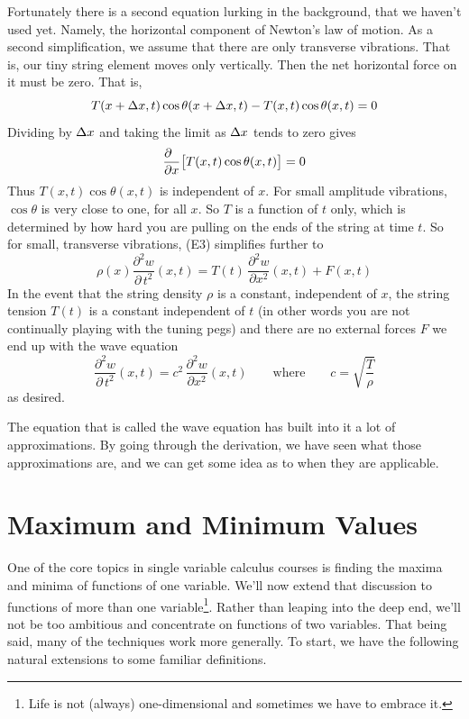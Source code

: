 Fortunately there is a second
equation lurking in the background, that we haven't used yet. Namely, the 
horizontal component of Newton's law of motion. As a second simplification,
we assume that there are only transverse vibrations. That is, our tiny 
string element moves only vertically. Then the net horizontal force on 
it must be zero. That is,
\begin{equation*}
T(x+\Delta x,t)\cos\theta(x+\Delta x,t)-T(x,t)\cos\theta(x,t)=0
\end{equation*}
Dividing by $\Delta x$ and taking the limit as $\Delta x$ tends to zero gives
\begin{equation*}
\frac{\partial \hfill}{\partial x}\big[T(x,t)\cos\theta(x,t)\big]=0
\end{equation*}
Thus $T(x,t)\cos\theta(x,t)$ is independent of $x$.
For small amplitude vibrations, $\cos\theta$ is very close to one, for all
$x$. So $T$ is a function of $t$ only, which is determined by how hard you are
pulling on the ends of the string at time $t$. So for small, transverse
vibrations, (E3) simplifies further to
\begin{equation*}
\rho(x)\frac{\partial^2 w}{\partial\, t^2}(x,t)
=T(t)\,\frac{\partial^2 w}{\partial x^2}(x,t)
+F(x,t)
\tag{E4}\end{equation*}
In the event that the string density $\rho$ is a constant, independent
of $x$, the string tension $T(t)$ is a constant independent of $t$
(in other words you are not continually playing with the tuning pegs)
and there are no external forces $F$ we end up with the wave equation
\begin{equation*}
\frac{\partial^2 w}{\partial\, t^2}(x,t)
=c^2\,\frac{\partial^2 w}{\partial x^2}(x,t)
\qquad
\text{where}\qquad
c=\sqrt{\frac{T}{\rho}}
\end{equation*}
as desired.

The equation that is called the wave equation has built into it a
lot of approximations. By going through the derivation, we have 
seen what those approximations are, and we can get some idea as to when they
are applicable.

\section{Maximum and Minimum Values}\label{sec max}

One of the core topics in single variable calculus courses 
is finding the maxima and minima of functions of one variable.
We'll now extend that discussion to functions of more than one 
variable\footnote{Life is not (always) one-dimensional and sometimes we have to embrace it.}. Rather than leaping into the deep end, we'll not be too 
ambitious and concentrate on functions of two variables. That being said, 
many of the techniques work more generally.
To start, we have the following natural extensions to some familiar
definitions.

